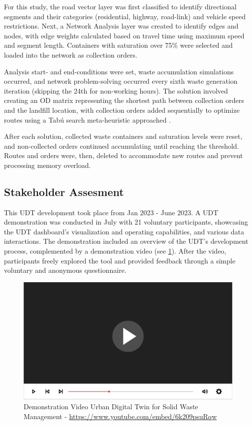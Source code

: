 \documentclass[authoryear,preprint,review,11pt,doubleblind]{elsarticle}
\begin{document}
    For this study, the road vector layer was first classified to identify directional segments and their categories (residential, highway, road-link) and vehicle speed restrictions. Next, a Network Analysis layer was created to identify edges and nodes, with edge weights calculated based on travel time using maximum speed and segment length. Containers with saturation over 75\% were selected and loaded into the network as collection orders.

    Analysis start- and end-conditions were set, waste accumulation simulations occurred, and network problem-solving occurred every sixth waste generation iteration (skipping the 24th for non-working hours). The solution involved creating an OD matrix representing the shortest path between collection orders and the landfill location, with collection orders added sequentially to optimize routes using a Tabú search meta-heuristic approached \citep{ESRI2023c}.

    After each solution, collected waste containers and saturation levels were reset, and non-collected orders continued accumulating until reaching the threshold. Routes and orders were, then, deleted to accommodate new routes and prevent processing memory overload.

    \subsection{Stakeholder Assesment} \label{sub:MethAssesment}

    This UDT development took place from Jan 2023 - June 2023. A UDT demonstration was conducted in July with 21 voluntary participants, showcasing the UDT dashboard's visualization and operating capabilities, and various data interactions. The demonstration included an overview of the UDT's development process, complemented by a demonstration video (see \ref{fig:video}). After the video, participants freely explored the tool and provided feedback through a simple voluntary and anonymous questionnaire.

    \begin{figure}[!ht]
        \centering
        \includegraphics[width=\linewidth]{Figures/video.png}
        \caption{Demonstration Video Urban Digital Twin for Solid Waste Management - \href{https://www.youtube.com/embed/6k209psuRqw}{https://www.youtube.com/embed/6k209psuRqw}}
        \label{fig:video}
    \end{figure}
\end{document}

